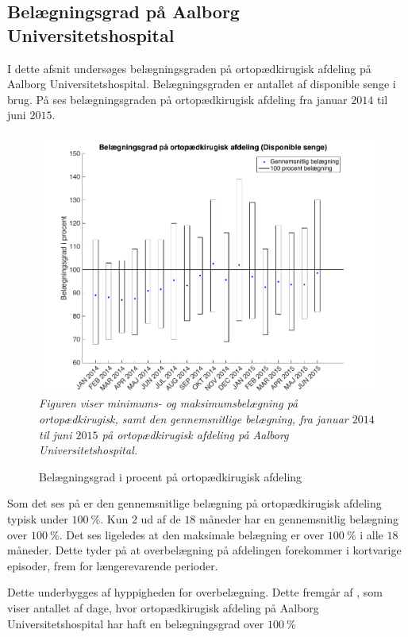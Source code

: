 \subsection{Belægningsgrad på Aalborg Universitetshospital}
I dette afsnit undersøges belægningsgraden på ortopædkirugisk afdeling på Aalborg Universitetshospital. Belægningsgraden er antallet af disponible senge i brug. På  ses belægningsgraden på ortopædkirugisk afdeling fra januar $2014$ til juni $2015$.\cite{SDS2015}

\begin{figure}[H]
	\flushleft 
	\caption{Belægningsgrad i procent på ortopædkirugisk afdeling}
	\centering
	\includegraphics[scale=.45]{figures/maxminoverbelaeg.png}
	\label{maxminbelaeg}
	\flushleft
	\textit{Figuren viser minimums- og maksimumsbelægning på ortopædkirugisk, samt den gennemsnitlige belægning, fra januar $2014$ til juni $2015$ på ortopædkirugisk afdeling på Aalborg Universitetshospital.\cite{SDS2015}}
\end{figure}

\noindent
Som det ses på  er den gennemsnitlige belægning på ortopædkirugisk afdeling typisk under $100~\%$. Kun $2$ ud af de $18$ måneder har en gennemsnitlig belægning over $100~\%$. Det ses ligeledes at den maksimale belægning er over $100~\%$ i alle $18$ måneder. Dette tyder på at overbelægning på afdelingen forekommer i kortvarige episoder, frem for længerevarende perioder.\cite{SDS2015}

Dette underbygges af hyppigheden for overbelægning. Dette fremgår af , som viser antallet af dage, hvor ortopædkirugisk afdeling på Aalborg Universitetshospital har haft en belægningsgrad over $100~\%$\cite{SDS2015}

